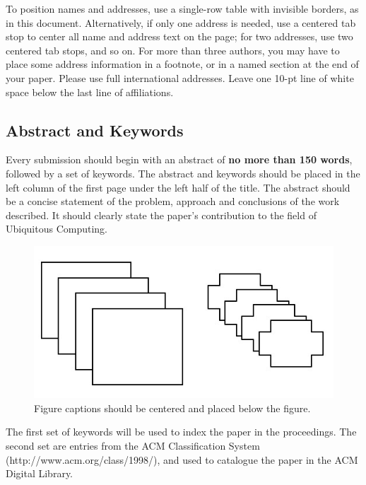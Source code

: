 \documentclass{ubicomp2012}
\begin{document}
To position names and addresses, use a single-row table with invisible
borders, as in this document.  Alternatively, if only one address is
needed, use a centered tab stop to center all name and address text on
the page; for two addresses, use two centered tab stops, and so
on. For more than three authors, you may have to place some address
information in a footnote, or in a named section at the end of your
paper. Please use full international addresses.  Leave one 10-pt line of white space below the last line of
affiliations.

\subsection{Abstract and Keywords}

Every submission should begin with an abstract of \textbf{no more than 150 words},
followed by a set of keywords. The abstract and keywords should be
placed in the left column of the first page under the left half of the
title. The abstract should be a concise statement of the problem,
approach and conclusions of the work described.  It should clearly
state the paper's contribution to the field of Ubiquitous Computing.

\begin{figure}[t]
\begin{center}
\includegraphics[width=0.90\columnwidth]{sample-fig.jpg}
\end{center}
\caption{Figure captions should be centered and placed below the
figure.}
\end{figure}

The first set of keywords will be used to index the paper in the
proceedings. The second set are entries from the ACM Classification
System
(http://www.acm.org/class/1998/), and used to catalogue the paper in the ACM
Digital Library.
\end{document}
